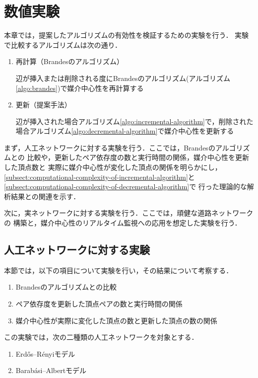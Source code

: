\chapter{数値実験}
\label{chap:experiment}

本章では，提案したアルゴリズムの有効性を検証するための実験を行う．
実験で比較するアルゴリズムは次の通り．
\begin{enumerate}
\item 再計算（Brandesのアルゴリズム）
  \par 辺が挿入または削除される度にBrandesのアルゴリズム(アルゴリズム\ref{algo:brandes})で媒介中心性を再計算する
\item 更新（提案手法）
  \par 辺が挿入された場合アルゴリズム\ref{algo:incremental-algorithm}で，削除された場合アルゴリズム\ref{algo:decremental-algorithm}で媒介中心性を更新する
\end{enumerate}

まず，人工ネットワークに対する実験を行う．ここでは，Brandesのアルゴリズムとの
比較や，更新したペア依存度の数と実行時間の関係，媒介中心性を更新した頂点数と
実際に媒介中心性が変化した頂点の関係を明らかにし，
\ref{subsect:computational-complexity-of-incremental-algorithm}と
\ref{subsect:computational-complexity-of-decremental-algorithm}で
行った理論的な解析結果との関連を示す．

次に，実ネットワークに対する実験を行う．ここでは，頑健な道路ネットワークの
構築と，媒介中心性のリアルタイム監視への応用を想定した実験を行う．

\section{人工ネットワークに対する実験}
\label{sect:exp-artificial}

本節では，以下の項目について実験を行い，その結果について考察する．
\begin{enumerate}
\item Brandesのアルゴリズムとの比較
\item ペア依存度を更新した頂点ペアの数と実行時間の関係
\item 媒介中心性が実際に変化した頂点の数と更新した頂点の数の関係
\end{enumerate}

この実験では，次の二種類の人工ネットワークを対象とする．
\begin{enumerate}
\item Erd\H{o}s--R\'{e}nyiモデル\cite{Erdos1959}
\item Barab\'{a}si--Albertモデル\cite{Barabasi1999}
\end{enumerate}

